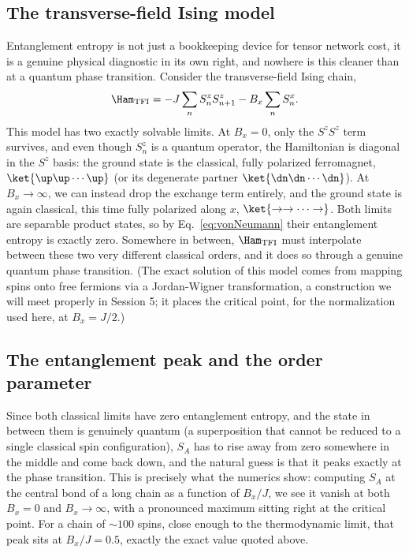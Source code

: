 \documentclass[all_sessions.tex]{subfiles}
\begin{document}
\subsection{The transverse-field Ising model}
\label{sec:tfi}
Entanglement entropy is not just a bookkeeping device for tensor network cost, it is a genuine
physical diagnostic in its own right, and nowhere is this cleaner than at a quantum phase
transition. Consider the transverse-field Ising chain,
\begin{equation}
  \Ham_{\mathrm{TFI}} = -J\sum_n S_n^z S_{n+1}^z - B_x \sum_n S_n^x.
  \label{eq:tfi}
\end{equation}
This model has two exactly solvable limits. At $B_x=0$, only the $S^zS^z$ term survives, and even
though $S^z_n$ is a quantum operator, the Hamiltonian is diagonal in the $S^z$ basis: the ground
state is the classical, fully polarized ferromagnet, $\ket{\up\up\cdots\up}$ (or its degenerate
partner $\ket{\dn\dn\cdots\dn}$). At $B_x\to\infty$, we can instead drop the exchange term entirely,
and the ground state is again classical, this time fully polarized along $x$,
$\ket{\to\to\cdots\to}$. Both limits are separable product states, so by
Eq.~\eqref{eq:vonNeumann} their entanglement entropy is exactly zero. Somewhere in between,
$\Ham_{\mathrm{TFI}}$ must interpolate between these two very different classical orders, and it
does so through a genuine quantum phase transition. (The exact solution of this model comes from
mapping spins onto free fermions via a Jordan-Wigner transformation, a construction we will meet
properly in Session 5; it places the critical point, for the normalization used here, at
$B_x = J/2$.)

\subsection{The entanglement peak and the order parameter}
Since both classical limits have zero entanglement entropy, and the state in between them is
genuinely quantum (a superposition that cannot be reduced to a single classical spin
configuration), $S_A$ has to rise away from zero somewhere in the middle and come back down, and
the natural guess is that it peaks exactly at the phase transition. This is precisely what the
numerics show: computing $S_A$ at the central bond of a long chain as a function of $B_x/J$, we
see it vanish at both $B_x=0$ and $B_x\to\infty$, with a pronounced maximum sitting right at the
critical point. For a chain of $\sim 100$ spins, close enough to the thermodynamic limit, that peak
sits at $B_x/J = 0.5$, exactly the exact value quoted above.
\end{document}

